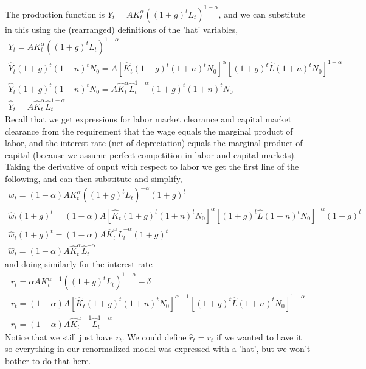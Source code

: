 The production function is $ Y_t=A K_t^{\alpha} ((1+g)^t L_t)^{1-\alpha}$, and we can substitute in this using the (rearranged) definitions of the 'hat' variables,
\begin{eqnarray*}
  Y_t=A K_t^{\alpha} ((1+g)^t L_t)^{1-\alpha} \\
  \hat{Y}_t (1+g)^t (1+n)^t N_0 = A [\hat{K}_t (1+g)^t (1+n)^t N_0 ]^{\alpha} [(1+g)^t \hat{L} (1+n)^t N_0]^{1-\alpha} \\
  \hat{Y}_t (1+g)^t (1+n)^t N_0 = A \hat{K}_t^{\alpha} \hat{L}_t^{1-\alpha} (1+g)^t (1+n)^t N_0 \\
  \hat{Y}_t = A \hat{K}_t^{\alpha} \hat{L}_t^{1-\alpha}
\end{eqnarray*}
Recall that we get expressions for labor market clearance and capital market clearance from the requirement that the wage equals the marginal product of labor, and the interest rate (net of depreciation) equals the marginal product of capital (because we assume perfect competition in labor and capital markets). Taking the derivative of ouput with respect to labor we get the first line of the following, and can then substitute and simplify,
\begin{eqnarray*}
 w_t=(1-\alpha) A K_t^{\alpha}  ((1+g)^t L_t)^{-\alpha} (1+g)^t \\
 \hat{w}_t (1+g)^t = (1-\alpha) A [\hat{K}_t (1+g)^t (1+n)^t N_0 ]^{\alpha} [(1+g)^t \hat{L} (1+n)^t N_0]^{-\alpha} (1+g)^t \\
 \hat{w}_t (1+g)^t = (1-\alpha) A \hat{K}_t^{\alpha} \hat{L}_t^{-\alpha} (1+g)^t \\
 \hat{w}_t = (1-\alpha) A \hat{K}_t^{\alpha} \hat{L}_t^{-\alpha}
\end{eqnarray*}
and doing similarly for the interest rate
\begin{eqnarray*}
 r_t=\alpha A K_t^{\alpha-1}  ((1+g)^t L_t)^{1-\alpha} -\delta \\
 r_t = (1-\alpha) A [\hat{K}_t (1+g)^t (1+n)^t N_0 ]^{\alpha-1} [(1+g)^t \hat{L} (1+n)^t N_0]^{1-\alpha} \\
 r_t = (1-\alpha) A \hat{K}_t^{\alpha-1} \hat{L}_t^{1-\alpha}
\end{eqnarray*}
Notice that we still just have $r_t$. We could define $\hat{r}_t=r_t$ if we wanted to have it so everything in our renormalized model was expressed with a 'hat', but we won't bother to do that here.

